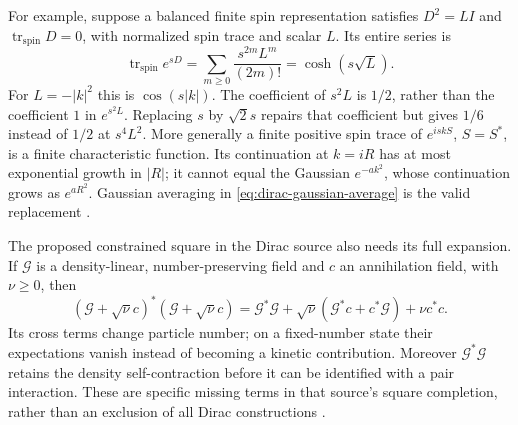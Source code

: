 \documentclass[11pt]{article}
\numberwithin{equation}{section}
\theoremstyle{definition}
\theoremstyle{remark}
\begin{document}
For example, suppose a balanced finite spin representation satisfies
$D^2=LI$ and $\operatorname{tr}_{\mathrm{spin}}D=0$, with normalized
spin trace and scalar $L$.  Its entire series is
\begin{equation}\label{eq:spin-trace-obstruction}
 \operatorname{tr}_{\mathrm{spin}}e^{sD}
 =\sum_{m\ge0}\frac{s^{2m}L^m}{(2m)!}
 =\cosh(s\sqrt L).
\end{equation}
For $L=-|k|^2$ this is $\cos(s|k|)$.  The coefficient of $s^2L$
is $1/2$, rather than the coefficient $1$ in $e^{s^2L}$.
Replacing $s$ by $\sqrt2s$ repairs that coefficient but gives $1/6$
instead of $1/2$ at $s^4L^2$.  More generally a finite positive spin
trace of $e^{iskS}$, $S=S^*$, is a finite characteristic function.
Its continuation at $k=iR$ has at most exponential growth in $|R|$;
it cannot equal the Gaussian $e^{-ak^2}$, whose continuation grows
as $e^{aR^2}$.  Gaussian averaging in
\eqref{eq:dirac-gaussian-average} is the valid replacement
\cite{smoothingnote,seedreview}.

The proposed constrained square in the Dirac source also needs its full
expansion.  If $\mathcal G$ is a density-linear, number-preserving field
and $c$ an annihilation field, with $\nu\ge0$, then
\[
 (\mathcal G+\sqrt\nu c)^*(\mathcal G+\sqrt\nu c)
 =\mathcal G^*\mathcal G
  +\sqrt\nu(\mathcal G^*c+c^*\mathcal G)+\nu c^*c.
\]
Its cross terms change particle number; on a fixed-number state their
expectations vanish instead of becoming a kinetic contribution.
Moreover $\mathcal G^*\mathcal G$ retains the density self-contraction
before it can be identified with a pair interaction.  These are
specific missing terms in that source's square completion, rather than
an exclusion of all Dirac constructions \cite{seedreview}.
\end{document}
